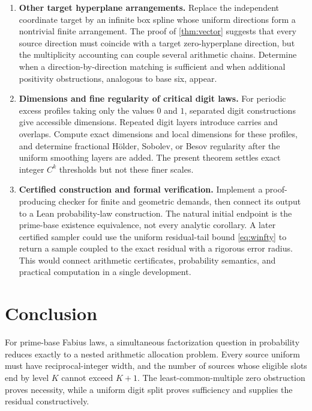 \documentclass[11pt,a4paper]{article}
\theoremstyle{remark}
\begin{document}
\begin{enumerate}[label=\textbf{Q\arabic*.},leftmargin=3em]
\item \textbf{Other target hyperplane arrangements.}
Replace the independent coordinate target by an infinite box spline whose
uniform directions form a nontrivial finite arrangement. The proof of
\cref{thm:vector} suggests that every source direction must coincide with a target
zero-hyperplane direction, but the multiplicity accounting can couple several
arithmetic chains. Determine when a direction-by-direction matching is sufficient
and when additional positivity obstructions, analogous to base six, appear.

\item \textbf{Dimensions and fine regularity of critical digit laws.}
For periodic excess profiles taking only the values $0$ and $1$, separated digit
constructions give accessible dimensions. Repeated digit layers introduce carries
and overlaps. Compute exact dimensions and local dimensions for these profiles,
and determine fractional H\"older, Sobolev, or Besov regularity after the uniform
smoothing layers are added. The present theorem settles exact integer
$C^k$ thresholds but not these finer scales.

\item \textbf{Certified construction and formal verification.}
Implement a proof-producing checker for finite and geometric demands, then
connect its output to a Lean probability-law construction. The natural initial
endpoint is the prime-base existence equivalence, not every analytic corollary.
A later certified sampler could use the uniform residual-tail bound
\eqref{eq:winfty} to return a sample coupled to the exact residual with a rigorous
error radius. This would connect arithmetic certificates, probability semantics,
and practical computation in a single development.
\end{enumerate}

\section{Conclusion}

For prime-base Fabius laws, a simultaneous factorization question in probability
reduces exactly to a nested arithmetic allocation problem. Every source uniform
must have reciprocal-integer width, and the number of sources whose eligible
slots end by level $K$ cannot exceed $K+1$. The least-common-multiple zero
obstruction proves necessity, while a uniform digit split proves sufficiency
and supplies the residual constructively.
\end{document}
